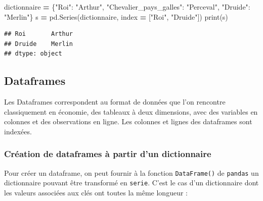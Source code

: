 \documentclass[12pt,]{book}
\newenvironment{Shaded}{\begin{snugshade}}{\end{snugshade}}
\newcommand{\StringTok}[1]{\textcolor[rgb]{0.31,0.60,0.02}{#1}}
\newcommand{\OperatorTok}[1]{\textcolor[rgb]{0.81,0.36,0.00}{\textbf{#1}}}
\newcommand{\BuiltInTok}[1]{#1}
\newcommand{\NormalTok}[1]{#1}
\numberwithin{equation}{section}
\numberwithin{countremarque}{section}
\begin{document}
\begin{Shaded}
\begin{Highlighting}[]
\NormalTok{dictionnaire }\OperatorTok{=}\NormalTok{ \{}\StringTok{"Roi"}\NormalTok{: }\StringTok{"Arthur"}\NormalTok{,}
                \StringTok{"Chevalier_pays_galles"}\NormalTok{: }\StringTok{"Perceval"}\NormalTok{,}
                \StringTok{"Druide"}\NormalTok{: }\StringTok{"Merlin"}\NormalTok{\}}
\NormalTok{s }\OperatorTok{=}\NormalTok{ pd.Series(dictionnaire, index }\OperatorTok{=}\NormalTok{ [}\StringTok{"Roi"}\NormalTok{, }\StringTok{"Druide"}\NormalTok{])}
\BuiltInTok{print}\NormalTok{(s)}
\end{Highlighting}
\end{Shaded}

\begin{lstlisting}
## Roi       Arthur
## Druide    Merlin
## dtype: object
\end{lstlisting}

\subsection{Dataframes}\label{dataframes}

Les Dataframes correspondent au format de données que l'on rencontre
classiquement en économie, des tableaux à deux dimensions, avec des
variables en colonnes et des observations en ligne. Les colonnes et
lignes des dataframes sont indexées.

\subsubsection{Création de dataframes à partir d'un
dictionnaire}\label{creation-de-dataframes-a-partir-dun-dictionnaire}

Pour créer un dataframe, on peut fournir à la fonction
\texttt{DataFrame()} de \texttt{pandas} un dictionnaire pouvant être
transformé en \texttt{serie}. C'est le cas d'un dictionnaire dont les
valeurs associées aux clés ont toutes la même longueur :
\end{document}
